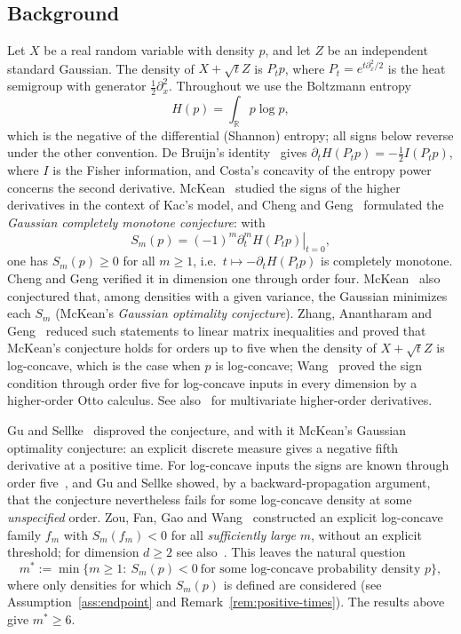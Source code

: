 \documentclass[11pt]{article}
\theoremstyle{definition}
\theoremstyle{remark}
\newcommand{\R}{\mathbb R}
\begin{document}
\subsection{Background}
Let $X$ be a real random variable with density $p$, and let $Z$ be an independent
standard Gaussian. The density of $X+\sqrt tZ$ is $P_tp$, where
$P_t=e^{t\partial_x^2/2}$ is the heat semigroup with generator $\tfrac12\partial_x^2$.
Throughout we use the Boltzmann entropy
\[
 H(p)=\int_\R p\log p,
\]
which is the negative of the differential (Shannon) entropy; all signs below reverse
under the other convention. De Bruijn's identity~\cite{Stam59} gives
$\partial_tH(P_tp)=-\tfrac12I(P_tp)$, where $I$ is the Fisher information, and
Costa's concavity of the entropy power~\cite{Costa85} concerns the second derivative.
McKean~\cite{McKean66} studied the signs of the higher derivatives in the context of
Kac's model, and Cheng and Geng~\cite{ChengGeng15} formulated the
\emph{Gaussian completely monotone conjecture}: with
\[
 S_m(p)=(-1)^m\left.\partial_t^mH(P_tp)\right|_{t=0},
\]
one has $S_m(p)\ge0$ for all $m\ge1$, i.e.\ $t\mapsto -\partial_tH(P_tp)$ is
completely monotone. Cheng and Geng verified it in dimension one through order four.
McKean~\cite{McKean66} also conjectured that, among densities with a given variance,
the Gaussian minimizes each $S_m$ (McKean's \emph{Gaussian optimality conjecture}).
Zhang, Anantharam and Geng~\cite{ZAG18} reduced such statements to linear matrix
inequalities and proved that McKean's conjecture holds for orders up to five when the
density of $X+\sqrt tZ$ is log-concave, which is the case when $p$ is log-concave;
Wang~\cite{Wang24} proved the sign condition through order five for log-concave
inputs in every dimension by a higher-order Otto calculus. See also~\cite{GYG22} for
multivariate higher-order derivatives.

Gu and Sellke~\cite{GuSellke26} disproved the conjecture, and with it McKean's Gaussian
optimality conjecture: an explicit discrete measure gives a negative fifth derivative
at a positive time. For log-concave inputs the signs are known through order
five~\cite{ZAG18,Wang24}, and Gu and Sellke showed, by a backward-propagation argument,
that the conjecture nevertheless fails for some log-concave density at some
\emph{unspecified} order. Zou, Fan, Gao and Wang~\cite{ZFGW26} constructed an explicit
log-concave family $f_m$ with $S_m(f_m)<0$ for all \emph{sufficiently large} $m$,
without an explicit threshold; for dimension $d\ge2$ see also~\cite{ZFGW26hex}. This
leaves the natural question
\[
 m^*:=\min\{m\ge1:\ S_m(p)<0\ \text{for some log-concave probability density }p\},
\]
where only densities for which $S_m(p)$ is defined are considered (see
Assumption~\ref{ass:endpoint} and Remark~\ref{rem:positive-times}). The results above
give $m^*\ge6$.
\end{document}
